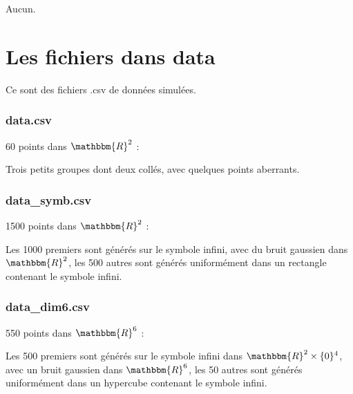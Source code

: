 \documentclass[10pt,a4paper,notitlepage]{article}
\newcommand{\R}{\mathbbm{R}}
\begin{document}
Aucun.

\section{Les fichiers dans data}

Ce sont des fichiers .csv de données simulées.

\subsubsection{data.csv}
60 points dans $\R^2$ :

Trois petits groupes dont deux collés, avec quelques points aberrants.

\subsubsection{data\_symb.csv}
1500 points dans $\R^2$ :

Les 1000 premiers sont générés sur le symbole infini, avec du bruit gaussien dans $\R^2$, les 500 autres sont générés uniformément dans un rectangle contenant le symbole infini.

\subsubsection{data\_dim6.csv}
550 points dans $\R^6$ :

Les 500 premiers sont générés sur le symbole infini dans $\R^2\times\{0\}^4$, avec un bruit gaussien dans $\R^6$, les 50 autres sont générés uniformément dans un hypercube contenant le symbole infini.
\end{document}
